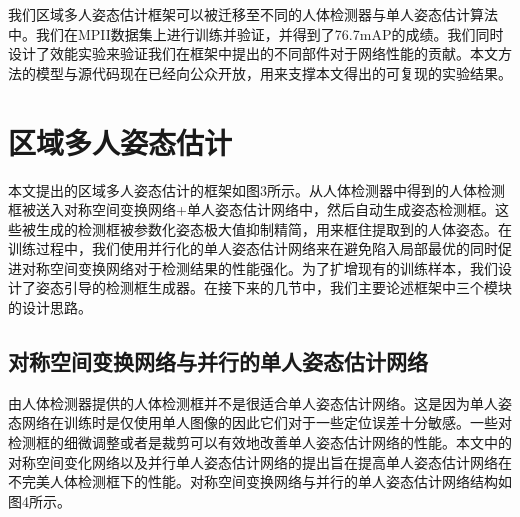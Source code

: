 我们区域多人姿态估计框架可以被迁移至不同的人体检测器与单人姿态估计算法中。我们在MPII数据集上进行训练并验证，并得到了76.7mAP的成绩。我们同时设计了效能实验来验证我们在框架中提出的不同部件对于网络性能的贡献。本文方法的模型与源代码现在已经向公众开放，用来支撑本文得出的可复现的实验结果。

\section*{区域多人姿态估计}
本文提出的区域多人姿态估计的框架如图3所示。从人体检测器中得到的人体检测框被送入对称空间变换网络+单人姿态估计网络中，然后自动生成姿态检测框。这些被生成的检测框被参数化姿态极大值抑制精简，用来框住提取到的人体姿态。在训练过程中，我们使用并行化的单人姿态估计网络来在避免陷入局部最优的同时促进对称空间变换网络对于检测结果的性能强化。为了扩增现有的训练样本，我们设计了姿态引导的检测框生成器。在接下来的几节中，我们主要论述框架中三个模块的设计思路。
\subsection*{对称空间变换网络与并行的单人姿态估计网络}
由人体检测器提供的人体检测框并不是很适合单人姿态估计网络。这是因为单人姿态网络在训练时是仅使用单人图像的因此它们对于一些定位误差十分敏感。一些对检测框的细微调整或者是裁剪可以有效地改善单人姿态估计网络的性能。本文中的对称空间变化网络以及并行单人姿态估计网络的提出旨在提高单人姿态估计网络在不完美人体检测框下的性能。对称空间变换网络与并行的单人姿态估计网络结构如图4所示。

